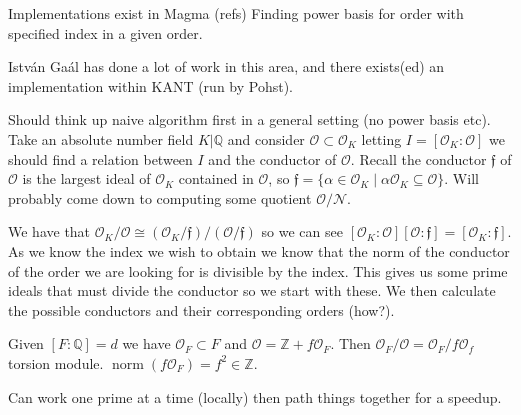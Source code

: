 \documentclass[11pt,a4paper]{article}
\begin{document}
\maketitle

Implementations exist in Magma (refs)
Finding power basis for order with specified index in a given order.

Istv\'an Ga\'al has done a lot of work in this area, and there exists(ed) an implementation within KANT (run by Pohst).

Should think up naive algorithm first in a general setting (no power basis etc).
Take an absolute number field $K|\mathbb{Q}$ and consider $\mathcal{O}\subset \mathcal{O}_K$ letting $I=[\mathcal{O}_K:\mathcal{O}]$ we should find a relation between $I$ and the conductor of $\mathcal{O}$.
Recall the conductor $\mathfrak{f}$ of $\mathcal{O}$ is the largest ideal of $\mathcal{O}_K$ contained in $\mathcal{O}$, so $\mathfrak{f} = \{\alpha\in\mathcal{O}_K\mid \alpha\mathcal{O}_K\subseteq \mathcal{O}\}$.
Will probably come down to computing some quotient $\mathcal{O}/\mathcal{N}$.

We have that $\mathcal{O}_K/\mathcal{O}\cong (\mathcal{O}_K/\mathfrak{f})/(\mathcal{O}/\mathfrak{f})$ so we can see $[\mathcal{O}_K:\mathcal{O}][\mathcal{O}:\mathfrak{f}] = [\mathcal{O}_K:\mathfrak{f}]$.
As we know the index we wish to obtain we know that the norm of the conductor of the order we are looking for is divisible by the index.
This gives us some prime ideals that must divide the conductor so we start with these.
We then calculate the possible conductors and their corresponding orders (how?).

Given $[F:\mathbb{Q}] = d$ we have $\mathcal{O}_F\subset F$ and $\mathcal{O} = \mathbb{Z} + f\mathcal{O}_F$.
Then $\mathcal{O}_F/\mathcal{O} = \mathcal{O}_F/f\mathcal{O}_f$ torsion module.
$\operatorname{norm}(f\mathcal{O}_F) = f^2 \in \mathbb{Z}$.

Can work one prime at a time (locally) then path things together for a speedup.

\nocite{*} %


\end{document}
